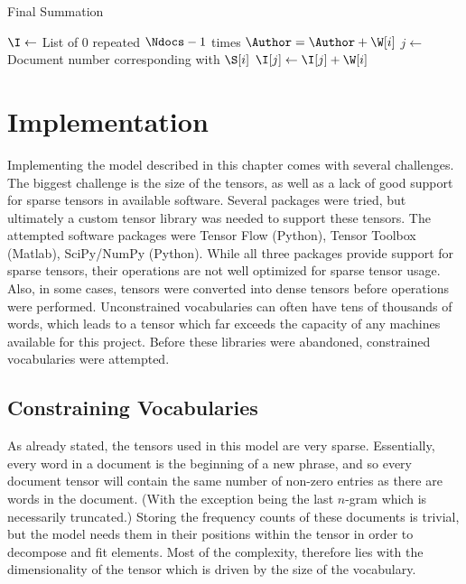 \documentclass[../ut-dissertation.tex]{subfiles}
\begin{document}
\begin{algorithm}
  \caption{Final Summation}
  \label{alg:summation}
   
   
  
  \Input{\Ndocs, \S, \W}
  \Output{\I, \Author}
  \BlankLine
  $\I \leftarrow $ List of 0 repeated $\Ndocs-1$ times\;
   {
     {
      $\Author = \Author + \W[i]$\;
    }{
      $j \leftarrow $ Document number corresponding with $\S[i]$\;
      $\I[j] \leftarrow \I[j] + \W[i]$\;
    }
  }
\end{algorithm}

\section{Implementation}
Implementing the model described in this chapter comes with several
challenges.  The biggest challenge is the size of the tensors, as well
as a lack of good support for sparse tensors in available software.
Several packages were tried, but ultimately a custom tensor library
was needed to support these tensors.  The attempted software packages
were Tensor Flow (Python), Tensor Toolbox (Matlab),  SciPy/NumPy
(Python).  While all three packages provide support for sparse
tensors, their operations are not well optimized for sparse tensor
usage.  Also, in some cases, tensors were converted into dense tensors
before operations were performed.  Unconstrained vocabularies can
often have tens of thousands of words, which leads to a tensor which
far exceeds the capacity of any machines available for this project.
Before these libraries were abandoned, constrained vocabularies were
attempted.

\subsection{Constraining Vocabularies}
As already stated, the tensors used in this model are very sparse.
Essentially, every word in a document is the beginning of a new
phrase, and so every document tensor will contain the same number of
non-zero entries as there are words in the document.  (With the
exception being the last $n$-gram which is necessarily truncated.)
Storing the frequency counts of these documents is trivial, but the
model needs them in their positions within the tensor in order to
decompose and fit elements.  Most of the complexity, therefore lies
with the dimensionality of the tensor which is driven by the size of
the vocabulary.
\end{document}
